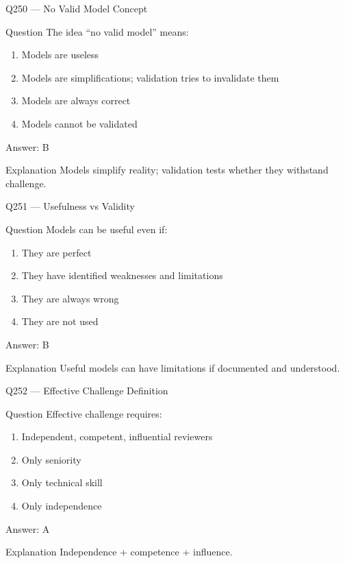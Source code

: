 \documentclass[aspectratio=169,8pt]{beamer}
\begin{document}
\begin{frame}{Q250 --- No Valid Model Concept}
\begin{block}{Question}
The idea ``no valid model'' means:
\begin{enumerate}
\item Models are useless
\item Models are simplifications; validation tries to invalidate them
\item Models are always correct
\item Models cannot be validated
\end{enumerate}
\end{block}
\begin{exampleblock}{Answer: B}\end{exampleblock}
\begin{block}{Explanation}
Models simplify reality; validation tests whether they withstand challenge.
\end{block}
\end{frame}

\begin{frame}{Q251 --- Usefulness vs Validity}
\begin{block}{Question}
Models can be useful even if:
\begin{enumerate}
\item They are perfect
\item They have identified weaknesses and limitations
\item They are always wrong
\item They are not used
\end{enumerate}
\end{block}
\begin{exampleblock}{Answer: B}\end{exampleblock}
\begin{block}{Explanation}
Useful models can have limitations if documented and understood.
\end{block}
\end{frame}

\begin{frame}{Q252 --- Effective Challenge Definition}
\begin{block}{Question}
Effective challenge requires:
\begin{enumerate}
\item Independent, competent, influential reviewers
\item Only seniority
\item Only technical skill
\item Only independence
\end{enumerate}
\end{block}
\begin{exampleblock}{Answer: A}\end{exampleblock}
\begin{block}{Explanation}
Independence + competence + influence.
\end{block}
\end{frame}
\end{document}
